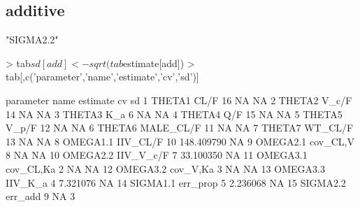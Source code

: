 \subsection{additive}
\begin{Schunk}
\begin{Soutput}
[1] "SIGMA2.2"
\end{Soutput}
\begin{Sinput}
> tab$sd[add] <- sqrt(tab$estimate[add])
> tab[,c('parameter','name','estimate','cv','sd')]
\end{Sinput}
\begin{Soutput}
   parameter      name estimate         cv sd
1     THETA1      CL/F       16         NA NA
2     THETA2     V_c/F       14         NA NA
3     THETA3       K_a        6         NA NA
4     THETA4       Q/F       15         NA NA
5     THETA5     V_p/F       12         NA NA
6     THETA6 MALE_CL/F       11         NA NA
7     THETA7   WT_CL/F       13         NA NA
8   OMEGA1.1  IIV_CL/F       10 148.409790 NA
9   OMEGA2.1  cov_CL,V        8         NA NA
10  OMEGA2.2 IIV_V_c/F        7  33.100350 NA
11  OMEGA3.1 cov_CL,Ka        2         NA NA
12  OMEGA3.2  cov_V,Ka        3         NA NA
13  OMEGA3.3   IIV_K_a        4   7.321076 NA
14  SIGMA1.1  err_prop        5   2.236068 NA
15  SIGMA2.2   err_add        9         NA  3
\end{Soutput}
\end{Schunk}
